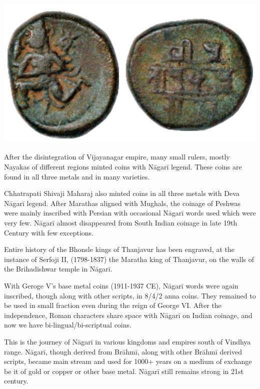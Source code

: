 \vskip 4pt

\centerline{\includegraphics[scale=0.5]{"images/article-06/art06-fig23.jpg"}}

After the disintegration of Vijayanagar empire, many small rulers, mostly Nayakas of different regions minted coins with Nāgarī legend. These coins are found in all three metals and in many varieties.

Chhatrapati Shivaji Maharaj also minted coins in all three metals with Deva Nāgarī legend. After Marathas aligned with Mughals, the coinage of Peshwas were mainly inscribed with Persian with occasional Nāgarī words used which were very few. Nāgarī almost disappeared from South Indian coinage in late 19th Century with few exceptions.

Entire history of the Bhonsle kings of Thanjavur has been engraved, at the instance of Serfoji II, (1798-1837) the Maratha king of Thanjavur, on the walls of the Brihadishwar temple in Nāgarī.

With Geroge V’s base metal coins (1911-1937 CE), Nāgarī words were again inscribed, though along with other scripts, in 8/4/2 anna coins. They remained to be used in small fraction even during the reign of George VI. After the independence, Roman characters share space with Nāgarī on Indian coinage, and now we have bi-lingual/bi-scriptual coins.

This is the journey of Nāgarī in various kingdoms and empires south of Vindhya range. Nāgarī, though derived from Brāhmī, along with other Brāhmī derived scripts, became main stream and used for 1000+ years on a medium of exchange be it of gold or copper or other base metal. Nāgarī still remains strong in 21st century.

